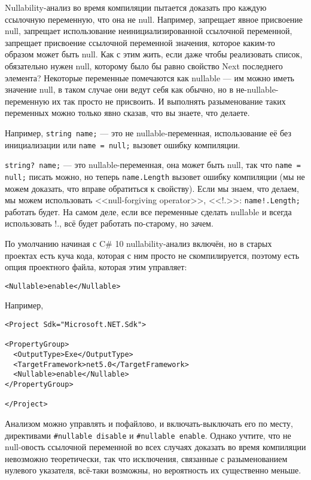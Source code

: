 \documentclass{../../text-style}
\begin{document}
Nullability-анализ во время компиляции пытается доказать про каждую ссылочную переменную, что она не null. Например, запрещает явное присвоение null, запрещает использование неинициализированной ссылочной переменной, запрещает присвоение ссылочной переменной значения, которое каким-то образом может быть null. Как с этим жить, если даже чтобы реализовать список, обязательно нужен null, которому было бы равно свойство Next последнего элемента? Некоторые переменные помечаются как nullable --- им можно иметь значение null, в таком случае они ведут себя как обычно, но в не-nullable-переменную их так просто не присвоить. И выполнять разыменование таких переменных можно только явно сказав, что вы знаете, что делаете. 

Например, \texttt{string name;} --- это не nullable-переменная, использование её без инициализации или \texttt{name = null;} вызовет ошибку компиляции. 

\texttt{string? name;} --- это nullable-переменная, она может быть null, так что \texttt{name = null;} писать можно, но теперь \texttt{name.Length} вызовет ошибку компиляции (мы не можем доказать, что вправе обратиться к свойству). Если мы знаем, что делаем, мы можем использовать <<null-forgiving operator>>, <<!.>>: \texttt{name!.Length;} работать будет. На самом деле, если все переменные сделать nullable и всегда использовать !., всё будет работать по-старому, но зачем.

По умолчанию начиная с C\# 10 nullability-анализ включён, но в старых проектах есть куча кода, которая с ним просто не скомпилируется, поэтому есть опция проектного файла, которая этим управляет:

\begin{verbatim}
<Nullable>enable</Nullable>
\end{verbatim}

Например,

\begin{verbatim}
<Project Sdk="Microsoft.NET.Sdk">

<PropertyGroup>
  <OutputType>Exe</OutputType>
  <TargetFramework>net5.0</TargetFramework>
  <Nullable>enable</Nullable>
</PropertyGroup>

</Project>
\end{verbatim}

Анализом можно управлять и пофайлово, и включать-выключать его по месту, директивами \texttt{#nullable disable} и \texttt{#nullable enable}. Однако учтите, что не null-овость ссылочной переменной во всех случаях доказать во время компиляции невозможно теоретически, так что исключения, связанные с разыменованием нулевого указателя, всё-таки возможны, но вероятность их существенно меньше.
\end{document}
